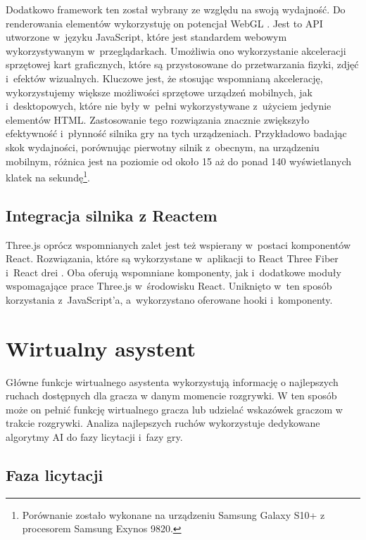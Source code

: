 Dodatkowo framework ten został wybrany ze względu na swoją wydajność.
Do renderowania elementów wykorzystuję on potencjał WebGL \cite{WebGL}.
Jest to API utworzone
w~języku JavaScript, które jest standardem webowym wykorzystywanym
w~przeglądarkach. Umożliwia ono wykorzystanie akceleracji sprzętowej kart
graficznych, które są przystosowane do przetwarzania fizyki, zdjęć
i~efektów wizualnych. Kluczowe jest, że stosując wspomnianą akcelerację,
wykorzystujemy większe możliwości sprzętowe urządzeń mobilnych, jak
i~desktopowych, które nie były w~pełni wykorzystywane z~użyciem
jedynie elementów HTML.
Zastosowanie tego rozwiązania
znacznie zwiększyło efektywność i~płynność silnika gry na tych urządzeniach.
Przykładowo badając skok wydajności, porównując pierwotny silnik z~obecnym,
na urządzeniu mobilnym, różnica jest na poziomie od około 15 aż do
ponad 140 wyświetlanych
klatek na sekundę\footnote{
    Porównanie zostało wykonane na urządzeniu
    Samsung Galaxy S10+ z procesorem Samsung Exynos 9820.
}.

\FloatBarrier

\subsection{Integracja silnika z Reactem}
Three.js oprócz wspomnianych zalet jest też wspierany w~postaci komponentów React.
Rozwiązania, które są wykorzystane w~aplikacji to React Three Fiber
\cite{ReactThreeFiber} i~React drei \cite{ReactDrei}. Oba oferują
wspomniane komponenty, jak i~dodatkowe moduły
wspomagające prace Three.js w~środowisku React. Uniknięto w~ten sposób korzystania
z~JavaScript'a, a~wykorzystano oferowane hooki i~komponenty.



\section{Wirtualny asystent}

Główne funkcje wirtualnego asystenta wykorzystują informację o najlepszych ruchach
dostępnych dla gracza w danym momencie rozgrywki.
W ten sposób może on pełnić funkcję wirtualnego gracza lub
udzielać wskazówek graczom w trakcie rozgrywki.
Analiza najlepszych ruchów wykorzystuje dedykowane algorytmy AI
do fazy licytacji i~fazy gry.

\subsection{Faza licytacji}

